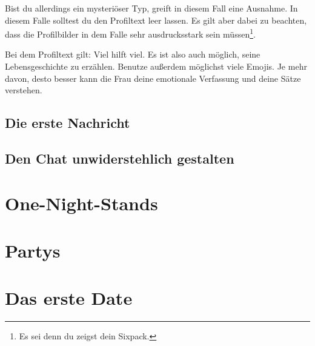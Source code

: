 Bist du allerdings ein mysteriöser Typ, greift in diesem Fall eine Ausnahme.
In diesem Falle solltest du den Profiltext leer lassen.
Es gilt aber dabei zu beachten, dass die Profilbilder in dem Falle sehr ausdrucksstark sein müssen\footnote{Es sei denn du zeigst dein Sixpack.}.

Bei dem Profiltext gilt: Viel hilft viel. 
Es ist also auch möglich, seine Lebensgeschichte zu erzählen.
Benutze außerdem möglichst viele Emojis.
Je mehr davon, desto besser kann die Frau deine emotionale Verfassung und deine Sätze verstehen.




%




\subsection{Die erste Nachricht}



\subsection{Den Chat unwiderstehlich gestalten}





\section{One-Night-Stands}





\section{Partys}





\section{Das erste Date}




